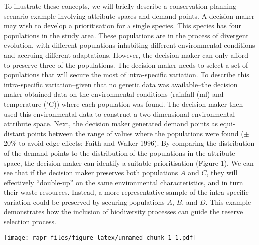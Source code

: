 \documentclass[11pt,]{article}
\let\origfigure\figure
\let\endorigfigure\endfigure
\renewenvironment{figure}[1][2] {
	\expandafter\origfigure\expandafter[H]
} {
	\endorigfigure
}
\begin{document}
To illustrate these concepts, we will briefly describe a conservation
planning scenario example involving attribute spaces and demand points.
A decision maker may wish to develop a prioritisation for a single
species. This species has four populations in the study area. These
populations are in the process of divergent evolution, with different
populations inhabiting different environmental conditions and accruing
different adaptations. However, the decision maker can only afford to
preserve three of the populations. The decision maker needs to select a
set of populations that will secure the most of intra-specific
variation. To describe this intra-specific variation--given that no
genetic data was available--the decision maker obtained data on the
environmental conditions (rainfall (ml) and temperature ($^{\circ}$C))
where each population was found. The decision maker then used this
environmental data to construct a two-dimensional environmental
attribute space. Next, the decision maker generated demand points as
equi-distant points between the range of values where the populations
were found ($\pm$ 20\% to avoid edge effects; Faith and Walker 1996). By
comparing the distribution of the demand points to the distribution of
the populations in the attribute space, the decision maker can identify
a suitable prioritisation (Figure 1). We can see that if the decision
maker preserves both populations $A$ and $C$, they will effectively
``double-up'' on the same environmental characteristics, and in turn
their waste resources. Instead, a more representative sample of the
intra-specific variation could be preserved by securing populations $A$,
$B$, and $D$. This example demonstrates how the inclusion of
biodiversity processes can guide the reserve selection process.

\begin{figure}[htbp]
\centering
\texttt{[image: rapr\_files/figure-latex/unnamed-chunk-1-1.pdf]}
\caption{Example of an attribute space. This environmental attribute
space has dimensions relating to annual temperature ($^{\circ}$C)and
rainfall (ml) values. Letters denote the environmental conditions
associated with the geographic locations where four hypothetical
populations are found. Points represent demand points. In this space,
populations closer to each other are considered more similar to each
other.}
\end{figure}
\end{document}
